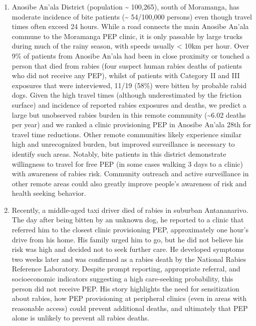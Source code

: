 \documentclass[
  oneside]{book}
\begin{document}
\begin{enumerate}
\def\labelenumi{\arabic{enumi}.}
\item
  Anosibe An'ala District (population \textasciitilde{} 100,265), south of Moramanga,
  has moderate incidence of bite patients (\textasciitilde{} 54/100,000 persons) even
  though travel times often exceed 24 hours. While a road connects the
  main Anosibe An'ala commune to the Moramanga PEP clinic, it is only
  passable by large trucks during much of the rainy season, with
  speeds usually \textless{} 10km per hour. Over 9\% of patients from Anosibe
  An'ala had been in close proximity or touched a person that died
  from rabies (four suspect human rabies deaths of patients who did
  not receive any PEP), whilst of patients with Category II and III
  exposures that were interviewed, 11/19 (58\%) were bitten by probable
  rabid dogs. Given the high travel times (although underestimated by
  the friction surface) and incidence of reported rabies exposures and
  deaths, we predict a large but unobserved rabies burden in this
  remote community (\textasciitilde6.02 deaths per year) and we ranked a clinic
  provisioning PEP in Anosibe An'ala 28th for travel time reductions.
  Other remote communities likely experience similar high and
  unrecognized burden, but improved surveillance is necessary to
  identify such areas. Notably, bite patients in this district
  demonstrate willingness to travel for free PEP (in some cases
  walking 3 days to a clinic) with awareness of rabies risk. Community
  outreach and active surveillance in other remote areas could also
  greatly improve people's awareness of risk and health seeking
  behavior.
\item
  Recently, a middle-aged taxi driver died of rabies in suburban
  Antananarivo. The day after being bitten by an unknown dog, he
  reported to a clinic that referred him to the closest clinic
  provisioning PEP, approximately one hour's drive from his home. His
  family urged him to go, but he did not believe his risk was high and
  decided not to seek further care. He developed symptoms two weeks
  later and was confirmed as a rabies death by the National Rabies
  Reference Laboratory. Despite prompt reporting, appropriate
  referral, and socioeconomic indicators suggesting a high
  care-seeking probability, this person did not receive PEP. His story
  highlights the need for sensitization about rabies, how PEP
  provisioning at peripheral clinics (even in areas with reasonable
  access) could prevent additional deaths, and ultimately that PEP
  alone is unlikely to prevent all rabies deaths.
\end{enumerate}
\end{document}
